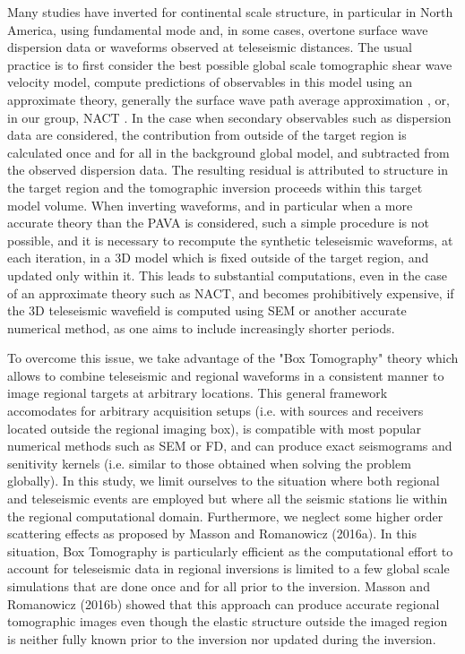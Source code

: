 \documentclass[12pt]{article}
\begin{document}
Many studies have inverted for continental scale structure, in particular in North America, using fundamental mode and, in some cases, overtone surface wave dispersion data or waveforms observed at teleseismic distances. 
The usual practice is to first consider the best possible global scale tomographic shear wave velocity model, compute predictions of observables in this model using an approximate theory, generally the surface wave path average approximation \citep[e.g.][]{nettles2008radially,bedle2009svelocity,schaeffer2014imaging}, or, in our group, NACT \citep{marone2007three,yuan20113}. 
In the case when secondary observables such as dispersion data are considered, the contribution from outside of the target region is calculated once and for all in the background global model, and subtracted from the observed dispersion data. 
The resulting residual is attributed to structure in the target region and the tomographic inversion proceeds within this target model volume. 
When inverting waveforms, and in particular when a more accurate theory than the PAVA is considered, such a simple procedure is not possible, and it is necessary to recompute the synthetic teleseismic waveforms, at each iteration, in a 3D model which is fixed outside of the target region, and updated only within it. 
This leads to substantial computations, even in the case of an approximate theory such as NACT, and becomes prohibitively expensive, if the 3D teleseismic wavefield is computed using SEM or another accurate numerical method, as one aims to include increasingly shorter periods.

To overcome this issue, we take advantage of the "Box Tomography" theory which allows to combine teleseismic and regional waveforms in a consistent manner to image regional targets at arbitrary locations. This general framework accomodates for arbitrary acquisition setups (i.e. with sources and receivers located outside the regional imaging box), is compatible with most popular numerical methods such as SEM or FD, and can produce exact seismograms and senitivity kernels (i.e. similar to those obtained when solving the problem globally). In this study, we limit ourselves to the situation where both regional and teleseismic events are employed but where all the seismic stations lie within the regional computational domain. Furthermore, we neglect some higher order scattering effects as proposed by Masson and Romanowicz (2016a). In this situation, Box Tomography is particularly efficient as the computational effort  to account for teleseismic data in regional inversions is limited to a few global scale simulations that are done once and for all prior to the inversion. Masson and Romanowicz (2016b) showed that this approach can produce accurate regional tomographic images even though the elastic structure outside the imaged region is neither fully known prior to the inversion nor updated during the inversion.  
\end{document}
